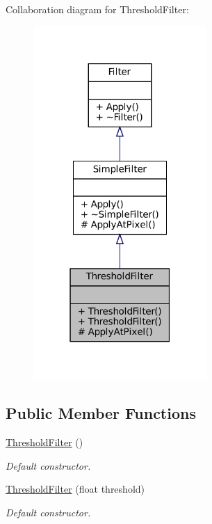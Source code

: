 Collaboration diagram for Threshold\+Filter\+:\nopagebreak
\begin{figure}[H]
\begin{center}
\leavevmode
\includegraphics[width=187pt]{classThresholdFilter__coll__graph}
\end{center}
\end{figure}
\subsection*{Public Member Functions}
\begin{DoxyCompactItemize}
\item 
\mbox{\label{classThresholdFilter_a12ba3301d876524d9790d20d4125774a}} 
\hyperlink{classThresholdFilter_a12ba3301d876524d9790d20d4125774a}{Threshold\+Filter} ()
\begin{DoxyCompactList}\small\item\em Default constructor. \end{DoxyCompactList}\item 
\hyperlink{classThresholdFilter_ac13253e54ab2cb9470c912dfc90c71e9}{Threshold\+Filter} (float threshold)
\begin{DoxyCompactList}\small\item\em Default constructor. \end{DoxyCompactList}\end{DoxyCompactItemize}

